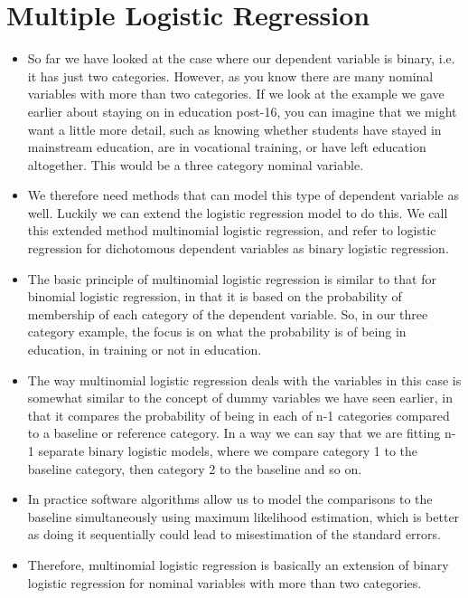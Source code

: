 \documentclass[a4paper,12pt]{article}
\begin{document}
\section*{Multiple Logistic Regression}
\begin{itemize}
\item So far we have looked at the case where our dependent variable is binary, i.e. it has just two categories. However, as you know there are many nominal variables with more than two categories. If we look at the example we gave earlier about staying on in education post-16, you can imagine that we might want a little more detail, such as knowing whether students have stayed in mainstream education, are in vocational training, or have left education altogether. This would be a three category nominal variable.

\item We therefore need methods that can model this type of dependent variable as well. Luckily we can extend the logistic regression model to do this. We call this extended method multinomial logistic regression, and refer to logistic regression for dichotomous dependent variables as binary logistic regression.

\item The basic principle of multinomial logistic regression is similar to that for binomial logistic regression, in that it is based on the probability of membership of each category of the dependent variable. So, in our three category example, the focus is on what the probability is of being in education, in training or not in education.

\item The way multinomial logistic regression deals with the variables in this case is somewhat similar to the concept of dummy variables we have seen earlier, in that it compares the probability of being in each of n-1 categories compared to a baseline or reference category. In a way we can say that we are fitting n-1 separate binary logistic models, where we compare category 1 to the baseline category, then category 2 to the baseline and so on. 
\item In practice software algorithms allow us to model the comparisons to the baseline simultaneously using maximum likelihood estimation, which is better as doing it sequentially could lead to misestimation of the standard errors. 
\item Therefore, multinomial logistic regression is basically an extension of binary logistic regression for nominal variables with more than two categories.
\end{itemize}
\newpage
\end{document}
